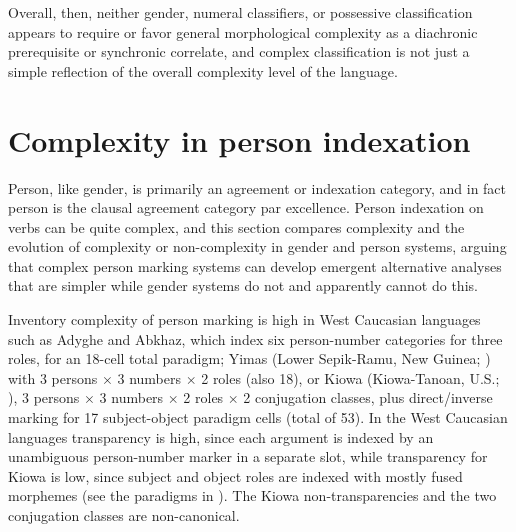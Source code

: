 \documentclass[output=collectionpaper]{langsci/langscibook}
\begin{document}
Overall, then, neither gender, numeral classifiers, or possessive classification appears to require or favor general morphological complexity as a diachronic prerequisite or synchronic correlate, and complex classification is not just a simple reflection of the overall complexity level of the language.




\section{Complexity in person indexation}
\label{sec:Nich:5}

Person, like gender, is primarily an agreement or indexation category, and in fact person is the clausal agreement category par excellence. Person indexation on verbs can be quite complex, and this section compares complexity and the evolution of complexity or non-complexity in gender and person systems, arguing that complex person marking systems can develop emergent alternative analyses that are simpler while gender systems do not and apparently cannot do this.

Inventory complexity of person marking is high in West Caucasian languages such as Adyghe and Abkhaz, which index six person-number categories for three roles, for an 18-cell total paradigm; Yimas (Lower Sepik-Ramu, New Guinea; \citealt{Foley1991}) with 3 persons $\times$ 3 numbers $\times$ 2 roles (also 18), or Kiowa (Kiowa-Tanoan, U.S.; \citealt{Watkins1984}), 3 persons $\times$ 3 numbers $\times$ 2 roles $\times$ 2 conjugation classes, plus direct/inverse marking for 17 subject-object paradigm cells (total of 53). In the West Caucasian languages transparency is high, since each argument is indexed by an unambiguous person-number marker in a separate slot, while transparency for Kiowa is low, since subject and object roles are indexed with mostly fused morphemes (see the paradigms in \citealt[115--116]{Watkins1984}). The Kiowa non-transparencies and the two conjugation classes are non-canonical.
\end{document}
